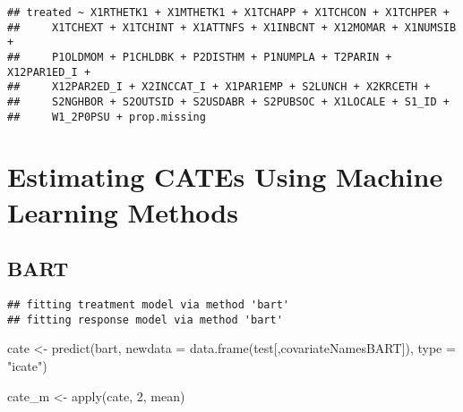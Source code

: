 \documentclass[
]{article}
\newenvironment{Shaded}{\begin{snugshade}}{\end{snugshade}}
\newcommand{\AttributeTok}[1]{\textcolor[rgb]{0.77,0.63,0.00}{#1}}
\newcommand{\CommentTok}[1]{\textcolor[rgb]{0.56,0.35,0.01}{\textit{#1}}}
\newcommand{\ConstantTok}[1]{\textcolor[rgb]{0.00,0.00,0.00}{#1}}
\newcommand{\DecValTok}[1]{\textcolor[rgb]{0.00,0.00,0.81}{#1}}
\newcommand{\FunctionTok}[1]{\textcolor[rgb]{0.00,0.00,0.00}{#1}}
\newcommand{\NormalTok}[1]{#1}
\newcommand{\OtherTok}[1]{\textcolor[rgb]{0.56,0.35,0.01}{#1}}
\newcommand{\SpecialCharTok}[1]{\textcolor[rgb]{0.00,0.00,0.00}{#1}}
\newcommand{\StringTok}[1]{\textcolor[rgb]{0.31,0.60,0.02}{#1}}
\begin{document}
\begin{verbatim}
## treated ~ X1RTHETK1 + X1MTHETK1 + X1TCHAPP + X1TCHCON + X1TCHPER + 
##     X1TCHEXT + X1TCHINT + X1ATTNFS + X1INBCNT + X12MOMAR + X1NUMSIB + 
##     P1OLDMOM + P1CHLDBK + P2DISTHM + P1NUMPLA + T2PARIN + X12PAR1ED_I + 
##     X12PAR2ED_I + X2INCCAT_I + X1PAR1EMP + S2LUNCH + X2KRCETH + 
##     S2NGHBOR + S2OUTSID + S2USDABR + S2PUBSOC + X1LOCALE + S1_ID + 
##     W1_2P0PSU + prop.missing
\end{verbatim}

\hypertarget{estimating-cates-using-machine-learning-methods}{%
\section{Estimating CATEs Using Machine Learning
Methods}\label{estimating-cates-using-machine-learning-methods}}

\hypertarget{bart}{%
\subsection{BART}\label{bart}}

\begin{Shaded}
\end{Shaded}

\begin{verbatim}
## fitting treatment model via method 'bart'
## fitting response model via method 'bart'
\end{verbatim}

\begin{Shaded}
\begin{Highlighting}[]
\NormalTok{cate }\OtherTok{\textless{}{-}} \FunctionTok{predict}\NormalTok{(bart,}
               \AttributeTok{newdata =} \FunctionTok{data.frame}\NormalTok{(test[,covariateNamesBART]),}
               \AttributeTok{type =} \StringTok{"icate"}\NormalTok{)}

\NormalTok{cate\_m }\OtherTok{\textless{}{-}} \FunctionTok{apply}\NormalTok{(cate, }\DecValTok{2}\NormalTok{, mean) }
\end{Highlighting}
\end{Shaded}
\end{document}
